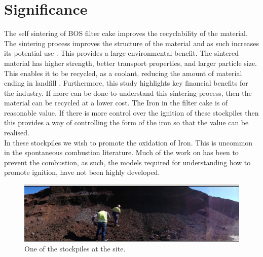 \section{Significance}
The self sintering of BOS filter cake improves the recyclability of the material. The sintering process improves the structure of the material and as such increases its potential use \cite{Ray19}. This provides a large environmental benefit. The sintered material has higher strength, better transport properties, and larger particle size. This enables it to be recycled, as a coolant, reducing the amount of material ending in landfill \cite{Ray19}. Furthermore, this study highlights key financial benefits for the industry. If more can be done to understand this sintering process, then the material can be recycled at a lower cost. The Iron in the filter cake is of reasonable value. If there is more control over the ignition of these stockpiles then this provides a way of controlling the form of the iron so that the value can be realised. \\
In these stockpiles we wish to promote the oxidation of Iron. This is uncommon in the spontaneous combustion literature. 
Much of the work on has been to prevent the combustion, as such, the models required for understanding how to promote ignition, have not been highly developed.

\begin{figure}[h!]
\centering
\includegraphics[scale=0.8]{figures/pile.jpg}
\caption{One of the stockpiles at the site.}
\end{figure}